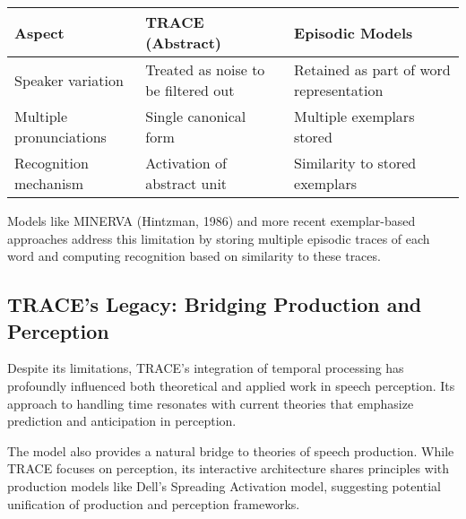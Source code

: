 \documentclass[12pt,a4paper]{article}
\begin{document}
\begin{tcolorbox}[enhanced, colback=green!5, colframe=green!75!black, title=Episodic vs. Abstract Representations]
\begin{tabular}{|p{4cm}|p{4cm}|p{4cm}|}
\hline
\textbf{Aspect} & \textbf{TRACE (Abstract)} & \textbf{Episodic Models} \\
\hline
Speaker variation & Treated as noise to be filtered out & Retained as part of word representation \\
\hline
Multiple pronunciations & Single canonical form & Multiple exemplars stored \\
\hline
Recognition mechanism & Activation of abstract unit & Similarity to stored exemplars \\
\hline
\end{tabular}
\end{tcolorbox}

Models like MINERVA (Hintzman, 1986) and more recent exemplar-based approaches address this limitation by storing multiple episodic traces of each word and computing recognition based on similarity to these traces.

\subsection{TRACE's Legacy: Bridging Production and Perception}

Despite its limitations, TRACE's integration of temporal processing has profoundly influenced both theoretical and applied work in speech perception. Its approach to handling time resonates with current theories that emphasize prediction and anticipation in perception.

The model also provides a natural bridge to theories of speech production. While TRACE focuses on perception, its interactive architecture shares principles with production models like Dell's Spreading Activation model, suggesting potential unification of production and perception frameworks.
\end{document}
